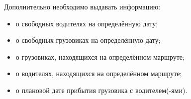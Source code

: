 Дополнительно необходимо выдавать информацию:
\begin{itemize}
	\item о свободных водителях на определённую дату;
	\item о свободных грузовиках на определённую дату;
	\item о грузовиках, находящихся на определённом маршруте;
	\item о водителях, находящихся на определённом маршруте;
	\item о плановой дате прибытия грузовика с водителем(-ями).
\end{itemize}